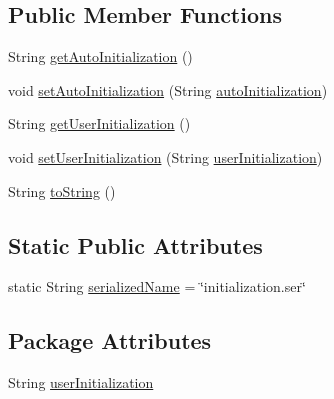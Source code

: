 \subsection*{Public Member Functions}
\begin{DoxyCompactItemize}
\item 
String \hyperlink{classit_1_1isislab_1_1masonhelperdocumentation_1_1_o_d_d_1_1_initialization_a1702d60449cb3ad4eb1dc783d84c3b24}{get\-Auto\-Initialization} ()
\item 
void \hyperlink{classit_1_1isislab_1_1masonhelperdocumentation_1_1_o_d_d_1_1_initialization_a31c86d190f85d0d57818f37e3af4d501}{set\-Auto\-Initialization} (String \hyperlink{classit_1_1isislab_1_1masonhelperdocumentation_1_1_o_d_d_1_1_initialization_add84e104d84378945c02ac09899cb527}{auto\-Initialization})
\item 
String \hyperlink{classit_1_1isislab_1_1masonhelperdocumentation_1_1_o_d_d_1_1_initialization_a093c1688664b440e4fb013895cc00651}{get\-User\-Initialization} ()
\item 
void \hyperlink{classit_1_1isislab_1_1masonhelperdocumentation_1_1_o_d_d_1_1_initialization_ae87ba06830489f8ce20818ee9bf418df}{set\-User\-Initialization} (String \hyperlink{classit_1_1isislab_1_1masonhelperdocumentation_1_1_o_d_d_1_1_initialization_ab6f374af9cc4feec7d5eae7cf16c22e3}{user\-Initialization})
\item 
String \hyperlink{classit_1_1isislab_1_1masonhelperdocumentation_1_1_o_d_d_1_1_initialization_a2ef8e1a36f2b1fdf31fbd256b1667001}{to\-String} ()
\end{DoxyCompactItemize}
\subsection*{Static Public Attributes}
\begin{DoxyCompactItemize}
\item 
static String \hyperlink{classit_1_1isislab_1_1masonhelperdocumentation_1_1_o_d_d_1_1_initialization_afef56cc7d44cf777469fb0e4b1573b3f}{serialized\-Name} = \char`\"{}initialization.\-ser\char`\"{}
\end{DoxyCompactItemize}
\subsection*{Package Attributes}
\begin{DoxyCompactItemize}
\item 
String \hyperlink{classit_1_1isislab_1_1masonhelperdocumentation_1_1_o_d_d_1_1_initialization_ab6f374af9cc4feec7d5eae7cf16c22e3}{user\-Initialization}
\end{DoxyCompactItemize}
